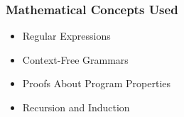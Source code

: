 {\begin{highlight}[\CSPBPPL]
        \subsubsection*{Mathematical Concepts Used}
        
        \begin{itemize}
            \item Regular Expressions
            \item Context-Free Grammars
            \item Proofs About Program Properties
            \item Recursion and Induction
        \end{itemize}
    \end{highlight}
}